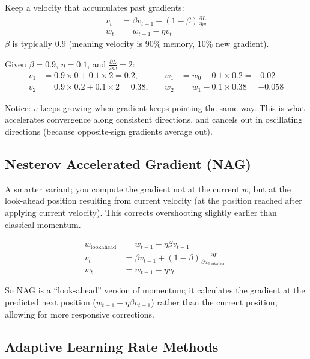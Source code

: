 Keep a velocity that accumulates past gradients:
\begin{align}
v_t &= \beta v_{t-1} + (1 - \beta) \frac{\partial L}{\partial w} \\
w_t &= w_{t-1} - \eta v_t
\end{align}
$\beta$ is typically $0.9$ (meaning velocity is 90\% memory, 10\% new gradient).

\begin{examplebox}
Given $\beta = 0.9$, $\eta = 0.1$, and $\frac{\partial L}{\partial w} = 2$:
\begin{align*}
v_1 &= 0.9 \times 0 + 0.1 \times 2 = 0.2, \quad &w_1 &= w_0 - 0.1 \times 0.2 = -0.02 \\
v_2 &= 0.9 \times 0.2 + 0.1 \times 2 = 0.38, \quad &w_2 &= w_1 - 0.1 \times 0.38 = -0.058
\end{align*}
\end{examplebox}

Notice: $v$ keeps growing when gradient keeps pointing the same way. This is what accelerates convergence along consistent directions, and cancels out in oscillating directions (because opposite-sign gradients average out).

\subsection{Nesterov Accelerated Gradient (NAG)}

A smarter variant; you compute the gradient not at the current $w$, but at the look-ahead position resulting from current velocity (at the position reached after applying current velocity). This corrects overshooting slightly earlier than classical momentum.

\begin{align}
w_{\text{lookahead}} &= w_{t-1} - \eta \beta v_{t-1} \\
v_t &= \beta v_{t-1} + (1 - \beta) \frac{\partial L}{\partial w_{\text{lookahead}}} \\
w_t &= w_{t-1} - \eta v_t
\end{align}

So NAG is a ``look-ahead'' version of momentum; it calculates the gradient at the predicted next position ($w_{t-1} - \eta \beta v_{t-1}$) rather than the current position, allowing for more responsive corrections.

\subsection{Adaptive Learning Rate Methods}

